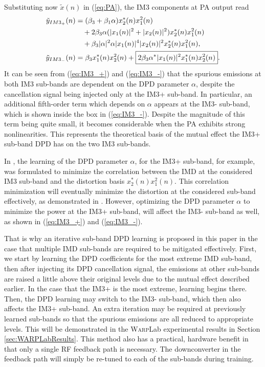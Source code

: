 Substituting now $\tilde{x}(n)$ in (\ref{eq:PA}), the IM3 components at PA output read
\begin{align}
\small
\tilde{y}_{IM3_+}(n) &= (\beta_3 + \beta_1 \alpha) x_2^*(n) x_1^2(n) \nonumber\\
& \quad + 2 \beta_3 \alpha (|x_1(n)|^2 + |x_2(n)|^2) x_2^*(n) x_1^2(n) \nonumber\\ 
& \quad + \beta_3 |\alpha|^2 \alpha |x_1(n)|^4 |x_2(n)|^2 x_2^*(n) x_1^2(n), \label{eq:IM3_+}\\
\tilde{y}_{IM3_-}(n) &=  \beta_3 x_1^*(n) x_2^2(n) + \boxed{2 \beta_3 \alpha^* |x_1(n)|^2 x_1^*(n) x_2^2(n)}. \label{eq:IM3_-}
\end{align}
\normalsize
It can be seen from (\ref{eq:IM3_+}) and (\ref{eq:IM3_-}) that the spurious emissions at both IM3 sub-bands are dependent on the DPD parameter $\alpha$, despite the cancellation signal being injected only at the IM3+ sub-band. 
In particular, an additional fifth-order term which depends on $\alpha$ appears at the IM3- sub-band, which is shown inside the box in (\ref{eq:IM3_-}). 
Despite the magnitude of this term being quite small, it becomes considerable when the PA exhibits strong nonlinearities. 
This represents the theoretical basis of the mutual effect the IM3+ sub-band DPD has on the two IM3 sub-bands. 

In \cite{ICASSP2014}, the learning of the DPD parameter $\alpha$, for the IM3+ sub-band, for example, was formulated to minimize the correlation between the IMD at the considered IM3 sub-band and the distortion basis $x_2^*(n)x_1^2(n)$. 
This correlation minimization will eventually minimize the distortion at the considered sub-band effectively, as demonstrated in \cite{ICASSP2014,Asilomar2015}. 
However, optimizing the DPD parameter $\alpha$ to minimize the power at the IM3+ sub-band, will affect the IM3- sub-band as well, as shown in (\ref{eq:IM3_+}) and (\ref{eq:IM3_-}). 

That is why an iterative sub-band DPD learning is proposed in this paper in the case that multiple IMD sub-bands are required to be mitigated effectively. 
First, we start by learning the DPD coefficients for the most extreme IMD sub-band, then after injecting its DPD cancellation signal, the emissions at other sub-bands are raised a little above their original levels due to the mutual effect described earlier. 
In the case that the IM3+ is the most extreme, learning begins there. Then, the DPD learning may switch to the IM3- sub-band, which then also affects the IM3+ sub-band. 
An extra iteration may be required at previously learned sub-bands so that the spurious emissions are all reduced to appropriate levels. This will be demonstrated in the \textsc{Warp}Lab experimental results in Section \ref{sec:WARPLabResults}. This method also has a practical, hardware benefit in that only a single RF feedback path is necessary. The downconverter in the feedback path will simply be re-tuned to each of the sub-bands during training. 

